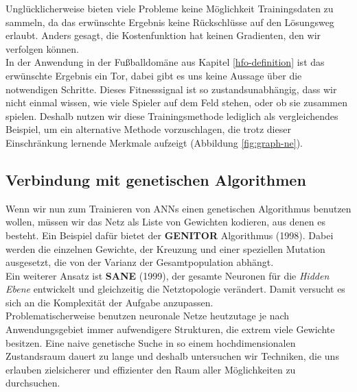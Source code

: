             \noindent
            Unglücklicherweise bieten viele Probleme keine Möglichkeit Trainingsdaten zu sammeln, da das erwünschte Ergebnis keine Rückschlüsse auf den Lösungsweg erlaubt. Anders gesagt, die Kostenfunktion hat keinen Gradienten, den wir verfolgen können. \\ 

            \noindent
            In der Anwendung in der Fußballdomäne aus Kapitel \ref{hfo-definition} ist das erwünschte Ergebnis ein Tor, dabei gibt es uns keine Aussage über die notwendigen Schritte. Dieses Fitnesssignal ist so zustandsunabhängig, dass wir nicht einmal wissen, wie viele Spieler auf dem Feld stehen, oder ob sie zusammen spielen. Deshalb nutzen wir diese Trainingsmethode lediglich als vergleichendes Beispiel, um ein alternative Methode vorzuschlagen, die trotz dieser Einschränkung lernende Merkmale aufzeigt (Abbildung \ref{fig:graph-ne}).

        \subsection{Verbindung mit genetischen Algorithmen}
            Wenn wir nun zum Trainieren von ANNs einen genetischen Algorithmus benutzen wollen, müssen wir das Netz als Liste von Gewichten kodieren, aus denen es besteht. Ein Beispiel dafür bietet der \textbf{GENITOR} \cite{moriarty1999evolutionary} Algorithmus (1998). Dabei werden die einzelnen Gewichte, der Kreuzung und einer speziellen Mutation ausgesetzt, die von der Varianz der Gesamtpopulation abhängt. \\

            \noindent
            Ein weiterer Ansatz ist \textbf{SANE} \cite{moriarty1999evolutionary} (1999), der gesamte Neuronen für die \textit{Hidden Ebene} entwickelt und gleichzeitig die Netztopologie verändert. Damit versucht es sich an die Komplexität der Aufgabe anzupassen. \\ %

            \noindent
            Problematischerweise benutzen neuronale Netze heutzutage je nach Anwendungsgebiet immer aufwendigere Strukturen, die extrem viele Gewichte besitzen. Eine naive genetische Suche in so einem hochdimensionalen Zustandsraum dauert zu lange und deshalb untersuchen wir Techniken, die uns erlauben zielsicherer und effizienter den Raum aller Möglichkeiten zu durchsuchen. 

